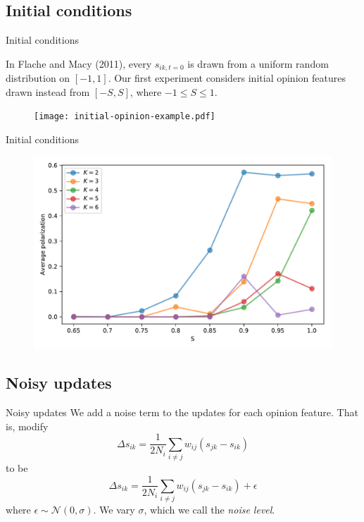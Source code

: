 \documentclass[11pt]{beamer}
\begin{document}
\subsection{Initial conditions}

\begin{frame}{Initial conditions}

  In Flache and Macy (2011), every $s_{ik,t=0}$ is drawn from a uniform random
  distribution on $[-1, 1]$. Our first experiment considers initial opinion
  features drawn instead from $[-S, S]$, where $-1 \leq S \leq 1$.
  \begin{figure}
    \centering
    \texttt{[image: initial-opinion-example.pdf]}
  \end{figure}
\end{frame}

\begin{frame}{Initial conditions}
  \begin{figure}
    \centering
    \includegraphics[width=\textwidth]{Figures/P_vs_S_for_K.pdf}
    \label{fig:p_vs_s_for_k}
  \end{figure}
\end{frame}

\subsection{Noisy updates}

\begin{frame}{Noisy updates}
  We add a noise term to the updates for each opinion feature. That is, modify
  \[
    \Delta s_{ik} = \frac{1}{2 N_i}\sum_{i \neq j} w_{ij} \left( s_{jk} - s_{ik} \right)
  \]
  to be
  \[
    \Delta s_{ik} = \frac{1}{2 N_i}\sum_{i \neq j} w_{ij} \left( s_{jk} - s_{ik} \right) + \epsilon
  \]
  where $\epsilon \sim  \mathcal{N} (0, \sigma)$. We vary $\sigma$, which we
  call the \emph{noise level}.
\end{frame}
\end{document}
